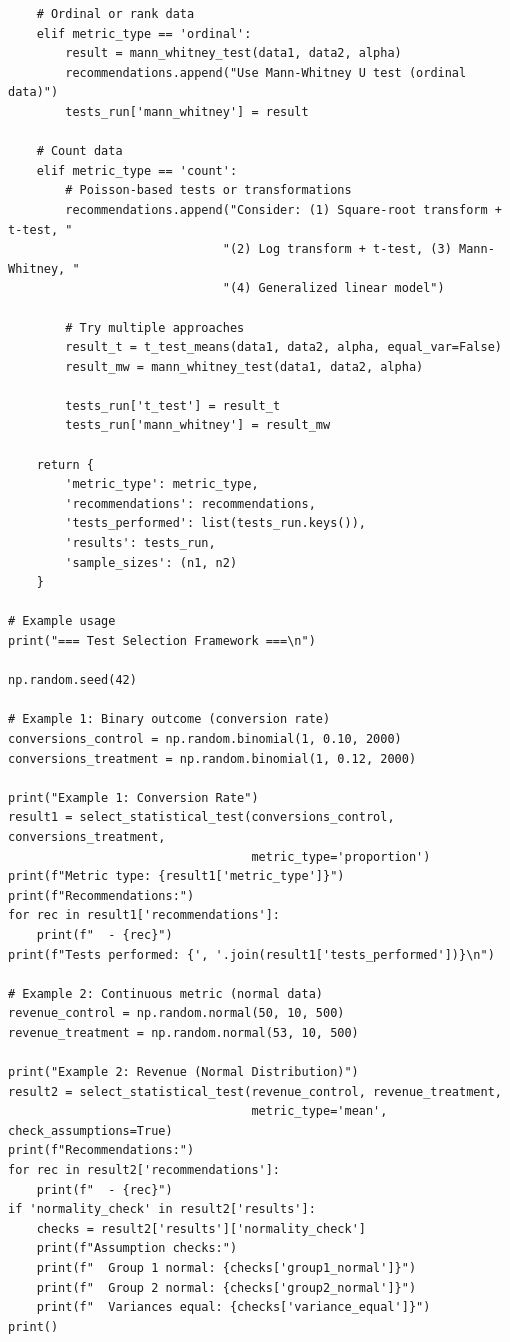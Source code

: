 \begin{lstlisting}
    # Ordinal or rank data
    elif metric_type == 'ordinal':
        result = mann_whitney_test(data1, data2, alpha)
        recommendations.append("Use Mann-Whitney U test (ordinal data)")
        tests_run['mann_whitney'] = result

    # Count data
    elif metric_type == 'count':
        # Poisson-based tests or transformations
        recommendations.append("Consider: (1) Square-root transform + t-test, "
                              "(2) Log transform + t-test, (3) Mann-Whitney, "
                              "(4) Generalized linear model")

        # Try multiple approaches
        result_t = t_test_means(data1, data2, alpha, equal_var=False)
        result_mw = mann_whitney_test(data1, data2, alpha)

        tests_run['t_test'] = result_t
        tests_run['mann_whitney'] = result_mw

    return {
        'metric_type': metric_type,
        'recommendations': recommendations,
        'tests_performed': list(tests_run.keys()),
        'results': tests_run,
        'sample_sizes': (n1, n2)
    }

# Example usage
print("=== Test Selection Framework ===\n")

np.random.seed(42)

# Example 1: Binary outcome (conversion rate)
conversions_control = np.random.binomial(1, 0.10, 2000)
conversions_treatment = np.random.binomial(1, 0.12, 2000)

print("Example 1: Conversion Rate")
result1 = select_statistical_test(conversions_control, conversions_treatment,
                                  metric_type='proportion')
print(f"Metric type: {result1['metric_type']}")
print(f"Recommendations:")
for rec in result1['recommendations']:
    print(f"  - {rec}")
print(f"Tests performed: {', '.join(result1['tests_performed'])}\n")

# Example 2: Continuous metric (normal data)
revenue_control = np.random.normal(50, 10, 500)
revenue_treatment = np.random.normal(53, 10, 500)

print("Example 2: Revenue (Normal Distribution)")
result2 = select_statistical_test(revenue_control, revenue_treatment,
                                  metric_type='mean', check_assumptions=True)
print(f"Recommendations:")
for rec in result2['recommendations']:
    print(f"  - {rec}")
if 'normality_check' in result2['results']:
    checks = result2['results']['normality_check']
    print(f"Assumption checks:")
    print(f"  Group 1 normal: {checks['group1_normal']}")
    print(f"  Group 2 normal: {checks['group2_normal']}")
    print(f"  Variances equal: {checks['variance_equal']}")
print()


\end{lstlisting}
